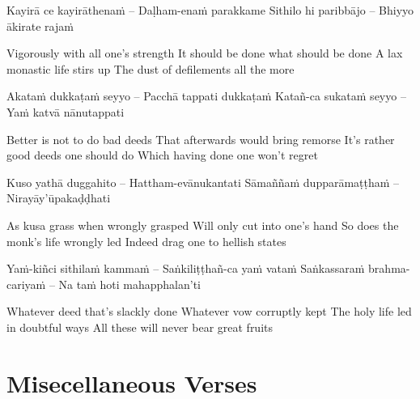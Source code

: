 \begin{twochants}
Kayirā ce kayirāthenaṁ – Daḷham-enaṁ parakkame
Sithilo hi paribbājo – Bhiyyo ākirate rajaṁ
\end{twochants}

\begin{english}
Vigorously with all one’s strength
It should be done what should be done
A lax monastic life stirs up
The dust of defilements all the more
\end{english}

\begin{twochants}
Akataṁ dukkaṭaṁ seyyo – Pacchā tappati dukkaṭaṁ
Katañ-ca sukataṁ seyyo – Yaṁ katvā nānutappati
\end{twochants}

\begin{english}
Better is not to do bad deeds
That afterwards would bring remorse
It’s rather good deeds one should do
Which having done one won’t regret
\end{english}

\begin{twochants}
Kuso yathā duggahito – Hattham-evānukantati
Sāmaññaṁ dupparāmaṭṭhaṁ – Nirayāy’ūpakaḍḍhati
\end{twochants}

\begin{english}
As kusa grass when wrongly grasped
Will only cut into one’s hand
So does the monk’s life wrongly led
Indeed drag one to hellish states
\end{english}

\begin{twochants}
Yaṁ-kiñci sithilaṁ kammaṁ – Saṅkiliṭṭhañ-ca yaṁ vataṁ
Saṅkassaraṁ brahma-cariyaṁ – Na taṁ hoti mahapphalan’ti
\end{twochants}

\begin{english}
Whatever deed that’s slackly done
Whatever vow corruptly kept
The holy life led in doubtful ways
All these will never bear great fruits
\end{english}


\clearpage

\section{Misecellaneous Verses}

\begin{leader}
\end{leader}

